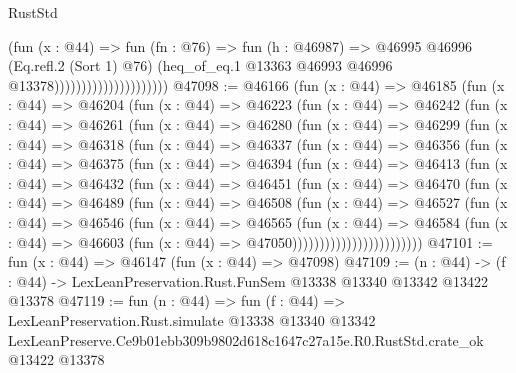 \begin{lexlean}{RustStd}
\begin{coremodule}
                                          (fun (x : @44) =>
                                          fun (fn : @76) =>
                                          fun (h : @46987) =>
                                          @46995
                                            @46996
                                            (Eq.refl.{2} (Sort 1) @76)
                                            (heq_of_eq.{1}
                                              @13363
                                              @46993
                                              @46996
                                              @13378)))))))))))))))))))))
@47098 := @46166
    (fun (x : @44) =>
    @46185
      (fun (x : @44) =>
      @46204
        (fun (x : @44) =>
        @46223
          (fun (x : @44) =>
          @46242
            (fun (x : @44) =>
            @46261
              (fun (x : @44) =>
              @46280
                (fun (x : @44) =>
                @46299
                  (fun (x : @44) =>
                  @46318
                    (fun (x : @44) =>
                    @46337
                      (fun (x : @44) =>
                      @46356
                        (fun (x : @44) =>
                        @46375
                          (fun (x : @44) =>
                          @46394
                            (fun (x : @44) =>
                            @46413
                              (fun (x : @44) =>
                              @46432
                                (fun (x : @44) =>
                                @46451
                                  (fun (x : @44) =>
                                  @46470
                                    (fun (x : @44) =>
                                    @46489
                                      (fun (x : @44) =>
                                      @46508
                                        (fun (x : @44) =>
                                        @46527
                                          (fun (x : @44) =>
                                          @46546
                                            (fun (x : @44) =>
                                            @46565
                                              (fun (x : @44) =>
                                              @46584
                                                (fun (x : @44) =>
                                                @46603
                                                  (fun (x : @44) => @47050))))))))))))))))))))))))
@47101 := fun (x : @44) => @46147 (fun (x : @44) => @47098)
@47109 := (n : @44) ->
  (f : @44) -> LexLeanPreservation.Rust.FunSem @13338 @13340 @13342 @13422 @13378
@47119 := fun (n : @44) =>
  fun (f : @44) =>
  LexLeanPreservation.Rust.simulate
    @13338
    @13340
    @13342
    LexLeanPreserve.Ce9b01ebb309b9802d618c1647c27a15e.R0.RustStd.crate_ok
    @13422
    @13378
\end{coremodule}
\end{lexlean}
